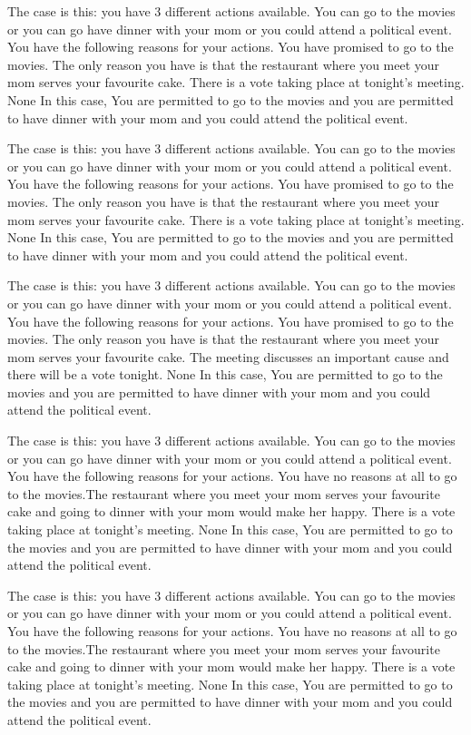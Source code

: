 The case is this: you have  3  different actions available.  You can go to the movies or you can go have dinner with your mom or you could attend a political event.
You have the following reasons for your actions.  You have promised to go to the movies. The only reason you have is that the restaurant where you meet your mom serves your favourite cake. There is a vote taking place at tonight's meeting. 
None
In this case,  You are permitted to go to the movies and you are permitted to have dinner with your mom and you could attend the political event.
 
The case is this: you have  3  different actions available.  You can go to the movies or you can go have dinner with your mom or you could attend a political event.
You have the following reasons for your actions.  You have promised to go to the movies. The only reason you have is that the restaurant where you meet your mom serves your favourite cake. There is a vote taking place at tonight's meeting. 
None
In this case,  You are permitted to go to the movies and you are permitted to have dinner with your mom and you could attend the political event.
 
The case is this: you have  3  different actions available.  You can go to the movies or you can go have dinner with your mom or you could attend a political event.
You have the following reasons for your actions.  You have promised to go to the movies. The only reason you have is that the restaurant where you meet your mom serves your favourite cake. The meeting discusses an important cause and there will be a vote tonight. 
None
In this case,  You are permitted to go to the movies and you are permitted to have dinner with your mom and you could attend the political event.
 
The case is this: you have  3  different actions available.  You can go to the movies or you can go have dinner with your mom or you could attend a political event.
You have the following reasons for your actions.  You have no reasons at all to go to the movies.The restaurant where you meet your mom serves your favourite cake and going to dinner with your mom would make her happy. There is a vote taking place at tonight's meeting. 
None
In this case,  You are permitted to go to the movies and you are permitted to have dinner with your mom and you could attend the political event.
 
The case is this: you have  3  different actions available.  You can go to the movies or you can go have dinner with your mom or you could attend a political event.
You have the following reasons for your actions.  You have no reasons at all to go to the movies.The restaurant where you meet your mom serves your favourite cake and going to dinner with your mom would make her happy. There is a vote taking place at tonight's meeting. 
None
In this case,  You are permitted to go to the movies and you are permitted to have dinner with your mom and you could attend the political event.
 
